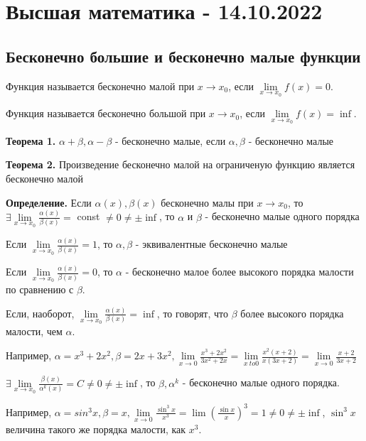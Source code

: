 \documentclass{article}
\begin{document}
\pagebreak
\section{Высшая математика - 14.10.2022}

\subsection{Бесконечно большие и бесконечно малые функции}

\begin{flushleft}

Функция называется бесконечно малой при $x \to x_0$, если $\lim\limits_{x \to x_0} f(x) = 0$.

Функция называется бесконечно большой при $x \to x_0$, если $\lim\limits_{x \to x_0} f(x) = \inf$.

\textbf{Теорема 1.} $\alpha + \beta, \alpha - \beta$ - бесконечно малые, если $\alpha, \beta$ - бесконечно малые

\textbf{Теорема 2.} Произведение бесконечно малой на ограниченую функцию является бесконечно малой

\textbf{Определение.} Если $\alpha(x), \beta(x)$ бесконечно малы при $x \to x_0$, то $\exists \lim\limits_{x \to x_0} \frac{\alpha(x)}{\beta(x)} = $ const $ \ne 0 \ne \pm \inf$, то $\alpha$ и $\beta$ - бесконечно малые одного порядка

Если $\lim\limits_{x \to x_0} \frac{\alpha(x)}{\beta(x)} = 1$, то $\alpha, \beta$ - эквивалентные бесконечно малые

\hfill

Если $\lim\limits_{x \to x_0} \frac{\alpha(x)}{\beta(x)} = 0$, то $\alpha$ - бесконечно малое более высокого порядка малости по сравнению с $\beta$.

Если, наоборот, $\lim\limits_{x \to x_0} \frac{\alpha(x)}{\beta(x)} = \inf$, то говорят, что $\beta$ более высокого порядка малости, чем $\alpha$.

Например, $\alpha = x^3 + 2x^2, \beta = 2x + 3x^2, \lim\limits_{x \to 0} \frac{x^3 + 2x^2}{3x^2 + 2x} = \lim\limits_{x \ to 0} \frac{x^2(x+2)}{x(3x + 2)} = \lim\limits_{x \to 0} \frac{x + 2}{3x + 2}$

\hfill

$\exists \lim\limits_{x \to x_0} \frac{\beta(x)}{\alpha^k(x)} = C \ne 0 \ne \pm \inf$, то $\beta, \alpha^k$ - бесконечно малые одного порядка.

Например, $\alpha = sin^3 x, \beta = x, \lim\limits_{x \to 0} \frac{\sin^3 x}{x^3} = \lim (\frac{\sin x}{x})^3 = 1 \ne 0 \ne \pm \inf$, $\sin^3 x$ величина такого же порядка малости, как $x^3$.


\end{flushleft}
\end{document}
